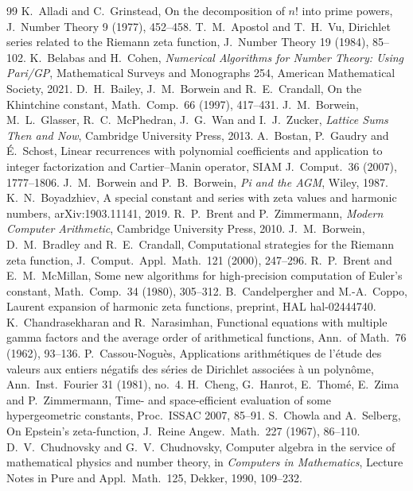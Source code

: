 \documentclass[11pt]{amsart}
\theoremstyle{definition}
\theoremstyle{remark}
\begin{document}
\begin{thebibliography}{99}
 K.~Alladi and C.~Grinstead, On the decomposition of $n!$ into prime powers, J.\ Number Theory 9 (1977), 452--458.
 T.~M.~Apostol and T.~H.~Vu, Dirichlet series related to the Riemann zeta function, J.\ Number Theory 19 (1984), 85--102.
 K.~Belabas and H.~Cohen, \emph{Numerical Algorithms for Number Theory: Using Pari/GP}, Mathematical Surveys and Monographs 254, American Mathematical Society, 2021.
 D.~H.~Bailey, J.~M.~Borwein and R.~E.~Crandall, On the Khintchine constant, Math.\ Comp.\ 66 (1997), 417--431.
 J.~M.~Borwein, M.~L.~Glasser, R.~C.~McPhedran, J.~G.~Wan and I.~J.~Zucker, \emph{Lattice Sums Then and Now}, Cambridge University Press, 2013.
 A.~Bostan, P.~Gaudry and \'E.~Schost, Linear recurrences with polynomial coefficients and application to integer factorization and Cartier--Manin operator, SIAM J.\ Comput.\ 36 (2007), 1777--1806.
 J.~M.~Borwein and P.~B.~Borwein, \emph{Pi and the AGM}, Wiley, 1987.
 K.~N.~Boyadzhiev, A special constant and series with zeta values and harmonic numbers, arXiv:1903.11141, 2019.
 R.~P.~Brent and P.~Zimmermann, \emph{Modern Computer Arithmetic}, Cambridge University Press, 2010.
 J.~M.~Borwein, D.~M.~Bradley and R.~E.~Crandall, Computational strategies for the Riemann zeta function, J.\ Comput.\ Appl.\ Math.\ 121 (2000), 247--296.
 R.~P.~Brent and E.~M.~McMillan, Some new algorithms for high-precision computation of Euler's constant, Math.\ Comp.\ 34 (1980), 305--312.
 B.~Candelpergher and M.-A.~Coppo, Laurent expansion of harmonic zeta functions, preprint, HAL hal-02444740.
 K.~Chandrasekharan and R.~Narasimhan, Functional equations with multiple gamma factors and the average order of arithmetical functions, Ann.\ of Math.\ 76 (1962), 93--136.
 P.~Cassou-Nogu\`es, Applications arithm\'etiques de l'\'etude des valeurs aux entiers n\'egatifs des s\'eries de Dirichlet associ\'ees \`a un polyn\^ome, Ann.\ Inst.\ Fourier 31 (1981), no.~4.
 H.~Cheng, G.~Hanrot, E.~Thom\'e, E.~Zima and P.~Zimmermann, Time- and space-efficient evaluation of some hypergeometric constants, Proc.\ ISSAC 2007, 85--91.
 S.~Chowla and A.~Selberg, On Epstein's zeta-function, J.\ Reine Angew.\ Math.\ 227 (1967), 86--110.
 D.~V.~Chudnovsky and G.~V.~Chudnovsky, Computer algebra in the service of mathematical physics and number theory, in \emph{Computers in Mathematics}, Lecture Notes in Pure and Appl.\ Math.\ 125, Dekker, 1990, 109--232.

\end{thebibliography}
\end{document}
